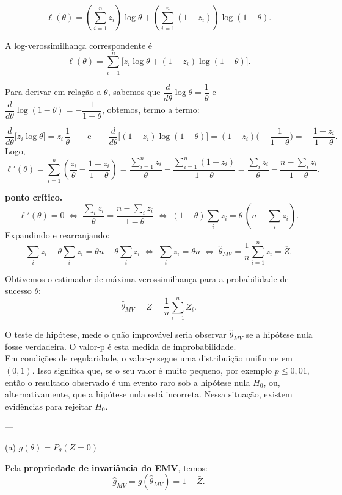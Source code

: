 \[
\ell(\theta)
= \left(\sum_{i=1}^{n} z_i\right)\log \theta
+ \left(\sum_{i=1}^{n}(1-z_i)\right)\log(1-\theta).
\]

A log-verossimilhança correspondente é
\[
\boxed{\ell(\theta) 
= \sum_{i=1}^n \big[z_i \log\theta + (1-z_i)\log(1-\theta)\big].}
\]

Para derivar em relação a \(\theta\), sabemos que 
\(\dfrac{d}{d\theta}\log\theta=\dfrac1\theta\) e 
\(\dfrac{d}{d\theta}\log(1-\theta)= -\dfrac1{1-\theta}\), obtemos,
termo a termo:

\[
\frac{d}{d\theta}\Big[z_i\log\theta\Big]
= z_i\,\frac1\theta
\qquad\text{e}\qquad
\frac{d}{d\theta}\Big[(1-z_i)\log(1-\theta)\Big]
= (1-z_i)\Big(-\frac1{1-\theta}\Big)
= -\,\frac{1-z_i}{1-\theta}.
\]
Logo,
\[
\ell'(\theta)
=\sum_{i=1}^n\left(\frac{z_i}{\theta}-\frac{1-z_i}{1-\theta}\right)
= \frac{\sum_{i=1}^n z_i}{\theta} - \frac{\sum_{i=1}^n(1-z_i)}{1-\theta}
= \frac{\sum_i z_i}{\theta} - \frac{n-\sum_i z_i}{1-\theta}.
\]

 \textbf{ponto crítico.}
\[
\ell'(\theta)=0
\;\Longleftrightarrow\;
\frac{\sum_i z_i}{\theta}
= \frac{n-\sum_i z_i}{1-\theta}
\;\Longleftrightarrow\;
(1-\theta)\sum_i z_i=\theta\,(n-\sum_i z_i).
\]
Expandindo e rearranjando:
\[
\sum_i z_i - \theta\sum_i z_i = \theta n - \theta\sum_i z_i
\;\Longleftrightarrow\;
\sum_i z_i = \theta n
\;\Longleftrightarrow\;
\widehat\theta_{MV}=\frac1n\sum_{i=1}^n z_i=\overline Z.
\]


Obtivemos o estimador de máxima verossimilhança para a probabilidade de sucesso \(\theta\):
\[
\boxed{\hat{\theta}_{MV} = \bar{Z} = \frac{1}{n}\sum_{i=1}^n Z_i.}
\]

O teste de hipótese, mede o quão improvável seria observar $\hat{\theta}_{MV}$ se a hipótese nula fosse verdadeira. O valor-p é esta medida de improbabilidade.
\\[1em]
Em condições de regularidade, o valor-$p$ segue uma distribuição uniforme em $(0,1)$.
Isso significa que, se o seu valor é muito pequeno, por exemplo $p \leq 0{,}01$,
então o resultado observado é um evento raro sob a hipótese nula $H_0$,
ou, alternativamente, que a hipótese nula está incorreta.
Nessa situação, existem evidências para rejeitar $H_0$.


---

(a) \( g(\theta) = P_\theta(Z=0) \)

Pela \textbf{propriedade de invariância do EMV}, temos:
\[
\boxed{\hat{g}_{MV} = g(\hat{\theta}_{MV}) = 1 - \bar{Z}.}
\]

